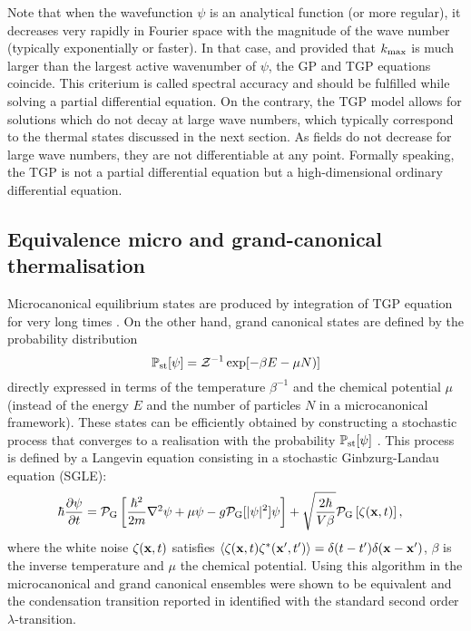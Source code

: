 \documentclass[sn-mathphys]{sn-jnl}%
\def\kmax{k_{\rm max}}
\newcommand\bet{{g}}
\newcommand\alps{{\frac{\hbar^2}{2m}}}
\newcommand\mub{{\mu}}
\newcommand\dertt[1]{ \frac{\partial{ #1}}{\partial t} }
\newcommand\gd{\mbox{${\bf \nabla}^{2}$}}
\begin{document}
{Note that when the wavefunction $\psi$ is an analytical function (or more regular), it decreases very rapidly in Fourier space with the magnitude of the wave number (typically exponentially or faster). In that case, and provided that $\kmax$ is much larger than the largest active wavenumber of $\psi$, the GP and TGP equations coincide. This criterium is called spectral accuracy and should be fulfilled while solving a partial differential equation. On the contrary, the TGP model allows for solutions which do not decay at large wave numbers, which typically correspond to the thermal states discussed in the next section. As fields do not decrease for large wave numbers, they are not differentiable at any point. Formally speaking, the TGP is not a partial differential equation but a high-dimensional ordinary differential equation.}


\subsection{Equivalence micro and grand-canonical thermalisation}\label{sec:equiv}

Microcanonical equilibrium states are produced by integration of TGP equation for very long times \cite{Davis01,Connaughton_2005,Berloff07}. 
On the other hand, grand canonical states are defined by the probability distribution 
\begin{equation}
\mathbb{P}_{\rm st}[\psi]=\mathcal{Z}^{-1}\exp[{-\beta E-\mu N)}] \label{eq:GC}
\end{equation}
directly expressed in terms of the temperature $\beta^{-1}$ and the chemical potential $\mu$ (instead of the energy $E$ and the number of particles $N$ in a microcanonical framework). These states can be efficiently obtained  by constructing a stochastic process that converges to a realisation with the probability $\mathbb{P}_{\rm st}[\psi]$ \cite{Krstulovic11}. This process is defined by a Langevin equation consisting in a stochastic Ginbzurg-Landau equation (SGLE):
\begin{equation}
\hbar\dertt{\psi} =\mathcal{P}_{\rm G}  \left[\alps \gd \psi +\mub \psi - \bet\mathcal{P}_{\rm G} [\lvert\psi\rvert^2]\psi\right]  +\sqrt{\frac{2 \hbar}{V\beta }}  \mathcal{P}_{\rm G} \left[\zeta({\bf x},t)\right] 
\label{Eq:SGLRphys},\hspace{3mm}
%
\end{equation}
where the white noise  $\zeta({\bf x},t)$ satisfies $\langle\zeta({\bf x},t)\zeta^*({\bf x'},t')\rangle=\delta(t-t') \delta({\bf x}-{\bf x'})$, $\beta$ is the inverse temperature and $\mu$ the chemical potential. 
%
Using this algorithm in \cite{Krstulovic11} the microcanonical and grand canonical ensembles were shown to be equivalent and the condensation transition reported in \cite{Davis01,Connaughton_2005} identified with the standard second order $\lambda$-transition. 
\end{document}
